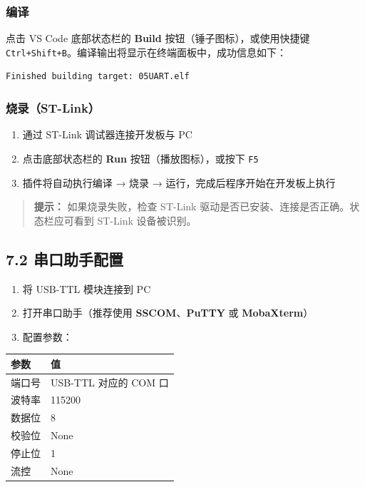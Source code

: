 \documentclass[
  chinese,
  UTF8,
  oneside,
  openany]{ctexbook}
\providecommand{\tightlist}{%
  \setlength{\itemsep}{0pt}\setlength{\parskip}{0pt}}
\begin{document}
\subsubsection{编译}\label{ux7f16ux8bd1}

点击 VS Code 底部状态栏的 \textbf{Build} 按钮（锤子图标），或使用快捷键
\texttt{Ctrl+Shift+B}。编译输出将显示在终端面板中，成功信息如下：

\begin{verbatim}
Finished building target: 05UART.elf
\end{verbatim}

\subsubsection{烧录（ST-Link）}\label{ux70e7ux5f55st-link}

\begin{enumerate}
\def\labelenumi{\arabic{enumi}.}
\tightlist
\item
  通过 ST-Link 调试器连接开发板与 PC
\item
  点击底部状态栏的 \textbf{Run} 按钮（播放图标），或按下 \texttt{F5}
\item
  插件将自动执行编译 → 烧录 → 运行，完成后程序开始在开发板上执行
\end{enumerate}

\begin{quote}
\textbf{提示：} 如果烧录失败，检查 ST-Link
驱动是否已安装、连接是否正确。状态栏应可看到 ST-Link 设备被识别。
\end{quote}

\subsection{7.2
串口助手配置}\label{ux4e32ux53e3ux52a9ux624bux914dux7f6e}

\begin{enumerate}
\def\labelenumi{\arabic{enumi}.}
\tightlist
\item
  将 USB-TTL 模块连接到 PC
\item
  打开串口助手（推荐使用 \textbf{SSCOM}、\textbf{PuTTY} 或
  \textbf{MobaXterm}）
\item
  配置参数：
\end{enumerate}

\begin{longtable}[]{@{}ll@{}}
\toprule\noalign{}
参数 & 值 \\
\midrule\noalign{}
\endhead
\bottomrule\noalign{}
\endlastfoot
端口号 & USB-TTL 对应的 COM 口 \\
波特率 & 115200 \\
数据位 & 8 \\
校验位 & None \\
停止位 & 1 \\
流控 & None \\
\end{longtable}
\end{document}
